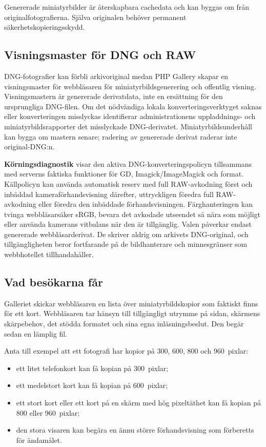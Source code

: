 \documentclass[11pt,a4paper]{article}
\newcommand{\ui}[1]{\textbf{#1}}
\begin{document}
Genererade miniatyrbilder är återskapbara cachedata och kan byggas om från
originalfotografierna. Själva originalen behöver permanent
säkerhetskopieringsskydd.

\subsection{Visningsmaster för DNG och RAW}

DNG-fotografier kan förbli arkivoriginal medan PHP Gallery skapar en
visningsmaster för webbläsaren för miniatyrbildsgenerering och offentlig
visning. Visningsmastern är genererade derivatdata, inte en ersättning för den
ursprungliga DNG-filen. Om det nödvändiga lokala konverteringsverktyget saknas
eller konverteringen misslyckas identifierar administrationens uppladdnings- och
miniatyrbildsrapporter det misslyckade DNG-derivatet. Miniatyrbildsunderhåll kan
bygga om mastern senare; radering av genererade derivat raderar inte
original-DNG:n.

\ui{Körningsdiagnostik} visar den aktiva DNG-konverteringspolicyn tillsammans
med serverns faktiska funktioner för GD, Imagick/ImageMagick och format.
Källpolicyn kan använda automatisk reserv med full RAW-avkodning först och
inbäddad kameraförhandsvisning därefter, uttryckligen föredra full RAW-avkodning
eller föredra den inbäddade förhandsvisningen. Färghanteringen kan tvinga
webbläsarsäker sRGB, bevara det avkodade utseendet så nära som möjligt eller
använda kamerans vitbalans när den är tillgänglig. Valen påverkar endast
genererade webbläsarderivat. De skriver aldrig om arkivets DNG-original, och
tillgängligheten beror fortfarande på de bildhanterare och minnesgränser som
webbhotellet tillhandahåller.

\subsection{Vad besökarna får}

Galleriet skickar webbläsaren en lista över miniatyrbildskopior som faktiskt
finns för ett kort. Webbläsaren tar hänsyn till tillgängligt utrymme på sidan,
skärmens skärpebehov, det stödda formatet och sina egna inläsningsbeslut. Den
begär sedan en lämplig fil.

Anta till exempel att ett fotografi har kopior på 300, 600, 800 och 960~pixlar:

\begin{itemize}
  \item ett litet telefonkort kan få kopian på 300~pixlar;
  \item ett medelstort kort kan få kopian på 600~pixlar;
  \item ett stort kort eller ett kort på en skärm med hög pixeltäthet kan få
  kopian på 800 eller 960~pixlar;
  \item den stora visaren kan begära en ännu större förhandsvisning som
  förberetts för ändamålet.
\end{itemize}
\end{document}
